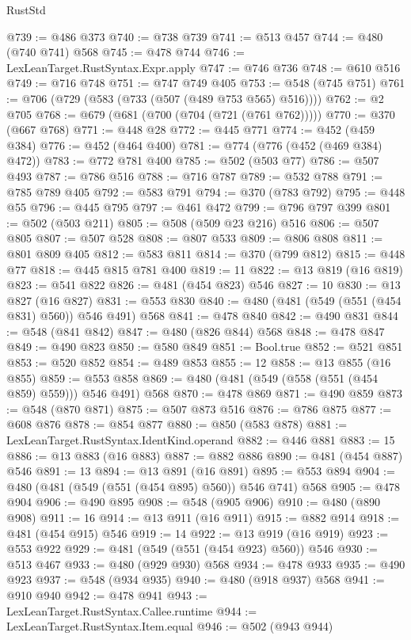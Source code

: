 \begin{lexlean}{RustStd}
\begin{coremodule}
@739 := @486 @373
@740 := @738 @739
@741 := @513 @457
@744 := @480 (@740 @741) @568
@745 := @478 @744
@746 := LexLeanTarget.RustSyntax.Expr.apply
@747 := @746 @736
@748 := @610 @516
@749 := @716 @748
@751 := @747 @749 @405
@753 := @548 (@745 @751)
@761 := @706 (@729 (@583 (@733 (@507 (@489 @753 @565) @516))))
@762 := @2 @705
@768 := @679 (@681 (@700 (@704 (@721 (@761 @762)))))
@770 := @370 (@667 @768)
@771 := @448 @28
@772 := @445 @771
@774 := @452 (@459 @384)
@776 := @452 (@464 @400)
@781 := @774 (@776 (@452 (@469 @384) @472))
@783 := @772 @781 @400
@785 := @502 (@503 @77)
@786 := @507 @493
@787 := @786 @516
@788 := @716 @787
@789 := @532 @788
@791 := @785 @789 @405
@792 := @583 @791
@794 := @370 (@783 @792)
@795 := @448 @55
@796 := @445 @795
@797 := @461 @472
@799 := @796 @797 @399
@801 := @502 (@503 @211)
@805 := @508 (@509 @23 @216) @516
@806 := @507 @805
@807 := @507 @528
@808 := @807 @533
@809 := @806 @808
@811 := @801 @809 @405
@812 := @583 @811
@814 := @370 (@799 @812)
@815 := @448 @77
@818 := @445 @815 @781 @400
@819 := 11
@822 := @13 @819 (@16 @819)
@823 := @541 @822
@826 := @481 (@454 @823) @546
@827 := 10
@830 := @13 @827 (@16 @827)
@831 := @553 @830
@840 := @480 (@481 (@549 (@551 (@454 @831) @560)) @546 @491) @568
@841 := @478 @840
@842 := @490 @831
@844 := @548 (@841 @842)
@847 := @480 (@826 @844) @568
@848 := @478 @847
@849 := @490 @823
@850 := @580 @849
@851 := Bool.true
@852 := @521 @851
@853 := @520 @852
@854 := @489 @853
@855 := 12
@858 := @13 @855 (@16 @855)
@859 := @553 @858
@869 := @480 (@481 (@549 (@558 (@551 (@454 @859) @559))) @546 @491) @568
@870 := @478 @869
@871 := @490 @859
@873 := @548 (@870 @871)
@875 := @507 @873 @516
@876 := @786 @875
@877 := @608 @876
@878 := @854 @877
@880 := @850 (@583 @878)
@881 := LexLeanTarget.RustSyntax.IdentKind.operand
@882 := @446 @881
@883 := 15
@886 := @13 @883 (@16 @883)
@887 := @882 @886
@890 := @481 (@454 @887) @546
@891 := 13
@894 := @13 @891 (@16 @891)
@895 := @553 @894
@904 := @480 (@481 (@549 (@551 (@454 @895) @560)) @546 @741) @568
@905 := @478 @904
@906 := @490 @895
@908 := @548 (@905 @906)
@910 := @480 (@890 @908)
@911 := 16
@914 := @13 @911 (@16 @911)
@915 := @882 @914
@918 := @481 (@454 @915) @546
@919 := 14
@922 := @13 @919 (@16 @919)
@923 := @553 @922
@929 := @481 (@549 (@551 (@454 @923) @560)) @546
@930 := @513 @467
@933 := @480 (@929 @930) @568
@934 := @478 @933
@935 := @490 @923
@937 := @548 (@934 @935)
@940 := @480 (@918 @937) @568
@941 := @910 @940
@942 := @478 @941
@943 := LexLeanTarget.RustSyntax.Callee.runtime
@944 := LexLeanTarget.RustSyntax.Item.equal
@946 := @502 (@943 @944)

\end{coremodule}
\end{lexlean}
